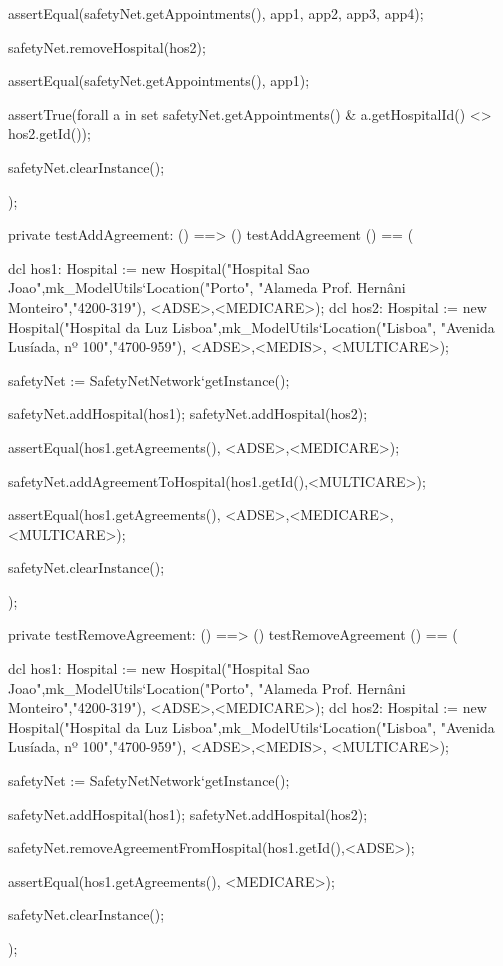 \begin{vdmpp}[breaklines=true]
  assertEqual(safetyNet.getAppointments(), {app1, app2, app3, app4}); 
  
  safetyNet.removeHospital(hos2);
  
  assertEqual(safetyNet.getAppointments(), {app1});
  
  assertTrue(forall a in set safetyNet.getAppointments() & a.getHospitalId() <> hos2.getId()); 
  
  safetyNet.clearInstance();
    
);

private testAddAgreement: () ==> ()
 testAddAgreement () == (
  
  dcl hos1: Hospital := new Hospital("Hospital Sao Joao",mk_ModelUtils`Location("Porto", "Alameda Prof. Hernâni Monteiro","4200-319"), {<ADSE>,<MEDICARE>});
  dcl hos2: Hospital := new Hospital("Hospital da Luz Lisboa",mk_ModelUtils`Location("Lisboa", "Avenida Lusíada, nº 100","4700-959"), {<ADSE>,<MEDIS>, <MULTICARE>});
  
  safetyNet := SafetyNetNetwork`getInstance();
   
  safetyNet.addHospital(hos1);
  safetyNet.addHospital(hos2);
  
  assertEqual(hos1.getAgreements(), {<ADSE>,<MEDICARE>});
  
  safetyNet.addAgreementToHospital(hos1.getId(),<MULTICARE>);
  
  assertEqual(hos1.getAgreements(), {<ADSE>,<MEDICARE>, <MULTICARE>});
  
  safetyNet.clearInstance();
    
);

private testRemoveAgreement: () ==> ()
 testRemoveAgreement () == (
  
  dcl hos1: Hospital := new Hospital("Hospital Sao Joao",mk_ModelUtils`Location("Porto", "Alameda Prof. Hernâni Monteiro","4200-319"), {<ADSE>,<MEDICARE>});
  dcl hos2: Hospital := new Hospital("Hospital da Luz Lisboa",mk_ModelUtils`Location("Lisboa", "Avenida Lusíada, nº 100","4700-959"), {<ADSE>,<MEDIS>, <MULTICARE>});
  
  safetyNet := SafetyNetNetwork`getInstance();
   
  safetyNet.addHospital(hos1);
  safetyNet.addHospital(hos2);
  
  safetyNet.removeAgreementFromHospital(hos1.getId(),<ADSE>);
  
  assertEqual(hos1.getAgreements(), {<MEDICARE>});
  
  safetyNet.clearInstance();
    
);



\end{vdmpp}
